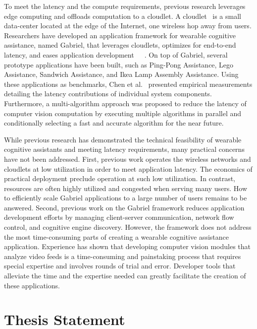 To meet the latency and the compute requirements, previous research leverages
edge computing and offloads computation to a cloudlet. A
cloudlet~\cite{satyanarayanan2009case} is a small data-center located at the
edge of the Internet, one wireless hop away from users. Researchers have
developed an application framework for wearable cognitive assistance, named
Gabriel, that leverages cloudlets, optimizes for end-to-end latency, and eases
application
development~\cite{chen2018application}~\cite{ha2014towards}~\cite{chen2017empirical}.
On top of Gabriel, several prototype applications have been built, such as
Ping-Pong Assistance, Lego Assistance, Sandwich Assistance, and Ikea Lamp
Assembly Assistance. Using these applications as benchmarks,
Chen et al.~\cite{chen2017empirical} presented empirical measurements detailing the latency
contributions of individual system components. Furthermore, a multi-algorithm
approach was proposed to reduce the latency of computer vision computation by
executing multiple algorithms in parallel and conditionally selecting a fast and
accurate algorithm for the near future.

While previous research has demonstrated the technical feasibility of wearable
cognitive assistants and meeting latency requirements, many practical concerns
have not been addressed. First, previous work operates the wireless networks and
cloudlets at low utilization in order to meet application latency. The economics
of practical deployment preclude operation at such low utilization. In contrast,
resources are often highly utilized and congested when serving many users. How
to efficiently scale Gabriel applications to a large number of users remains to
be answered. Second, previous work on the Gabriel framework reduces application
development efforts by managing client-server communication, network flow
control, and cognitive engine discovery. However, the framework does not address
the most time-consuming parts of creating a wearable cognitive assistance
application. Experience has shown that developing computer vision modules that
analyze video feeds is a time-consuming and painstaking process that requires
special expertise and involves rounds of trial and error. Developer tools that
alleviate the time and the expertise needed can greatly facilitate the creation
of these applications.


\section{Thesis Statement}

